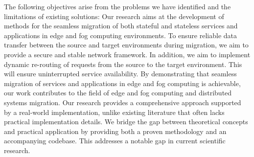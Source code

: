 

The following objectives arise from the problems we have identified and the limitations of existing solutions: Our research aims at the development of methods for the seamless migration of both stateful and stateless services and applications in edge and fog computing environments. To ensure reliable data transfer between the source and target environments during migration, we aim to provide a secure and stable network framework. In addition, we aim to implement dynamic re-routing of requests from the source to the target environment. This will ensure uninterrupted service availability.
By demonstrating that seamless migration of services and applications in edge and fog computing is achievable, our work contributes to the field of edge and fog computing and distributed systems migration. Our research provides a comprehensive approach supported by a real-world implementation, unlike existing literature that often lacks practical implementation details. We bridge the gap between theoretical concepts and practical application by providing both a proven methodology and an accompanying codebase. This addresses a notable gap in current scientific research.


